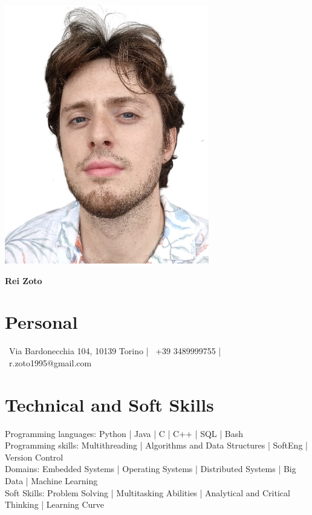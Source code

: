 \documentclass[a4paper]{article}
\begin{document}
\begin{minipage}{0.2\textwidth}
    \includegraphics[width=\linewidth]{propic-crop.png}
\end{minipage}
\hspace{2cm}
\begin{minipage}{0.59\textwidth}
    {\huge\bfseries Rei Zoto}
\end{minipage}

\section*{Personal}
\faMapMarker\ Via Bardonecchia 104, 10139 Torino \hspace{1em} | \hspace{1em}
\faMobile\ +39 3489999755 \hspace{1em} | \hspace{1em}
\faEnvelope\ r.zoto1995@gmail.com  

\section*{Technical and Soft Skills}
Programming languages: Python | Java | C | C++ | SQL | Bash \\
Programming skills: Multithreading | Algorithms and Data Structures | SoftEng | Version Control \\
Domains: Embedded Systems | Operating Systems | Distributed Systems | Big Data | Machine Learning \\
Soft Skills: Problem Solving | Multitasking Abilities | Analytical and Critical Thinking | Learning Curve
\end{document}
